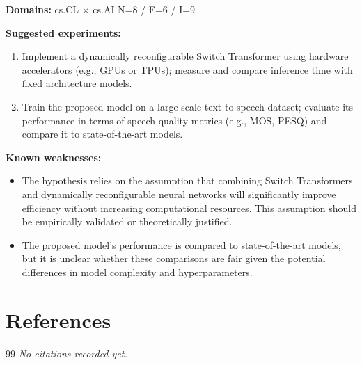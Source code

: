\documentclass[12pt,a4paper]{article}
\begin{document}
\noindent\textbf{Domains:} cs.CL $\times$ cs.AI
\hspace{1em} N=8 / F=6 / I=9

\textbf{Suggested experiments:}
\begin{enumerate}
  \item Implement a dynamically reconfigurable Switch Transformer using hardware accelerators (e.g., GPUs or TPUs); measure and compare inference time with fixed architecture models.
  \item Train the proposed model on a large-scale text-to-speech dataset; evaluate its performance in terms of speech quality metrics (e.g., MOS, PESQ) and compare it to state-of-the-art models.
\end{enumerate}

\textbf{Known weaknesses:}
\begin{itemize}
  \item The hypothesis relies on the assumption that combining Switch Transformers and dynamically reconfigurable neural networks will significantly improve efficiency without increasing computational resources. This assumption should be empirically validated or theoretically justified.
  \item The proposed model's performance is compared to state-of-the-art models, but it is unclear whether these comparisons are fair given the potential differences in model complexity and hyperparameters.
\end{itemize}


\section{References}

\begin{thebibliography}{99}
\textit{No citations recorded yet.}
\end{thebibliography}
\end{document}
